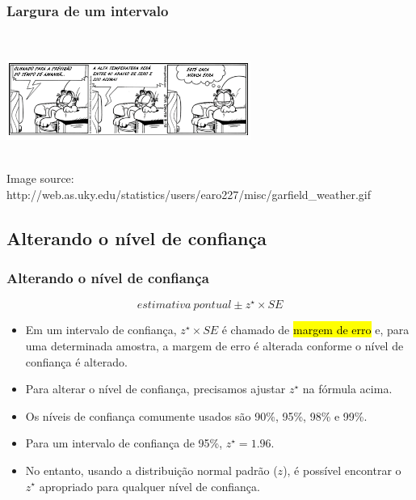 \begin{frame}
\frametitle{Largura de um intervalo}
\justifying
{}

\pause


$\:$ \\

\pause
\justifying
{}
\begin{center}
\includegraphics[width=0.6\textwidth]{4-2_conf_int/garfield.png}
\end{center}

\pause
\justifying
{}\\
\justifying
{\scriptsize Image source: http://web.as.uky.edu/statistics/users/earo227/misc/garfield\_weather.gif}

\end{frame}




\subsection{Alterando o nível de confiança}


\begin{frame}
\frametitle{Alterando o nível de confiança}
\justifying
\[ estimativa~pontual\pm z^\star \times SE \] 

\begin{itemize}
\justifying
\item Em um intervalo de confiança, $z ^ \star \times SE $ é chamado de \hl {margem de erro} e, para uma determinada amostra, a margem de erro é alterada conforme o nível de confiança é alterado.
\justifying
\item Para alterar o nível de confiança, precisamos ajustar $ z ^ \star $ na fórmula acima.
\justifying
\item Os níveis de confiança comumente usados são 90\%, 95\%, 98\% e 99\%.
\justifying
\item Para um intervalo de confiança de 95\%, $ z ^ \star = 1.96 $.
\justifying
\item No entanto, usando a distribuição normal padrão ($ z $), é possível encontrar o $ z ^ \star $ apropriado para qualquer nível de confiança.

\end{itemize}

\end{frame}

